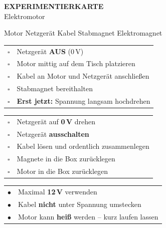 \documentclass[11pt, a5paper]{article}
\begin{document}
\begin{center}
    {\Large\bfseries\textcolor{fachfarbe}{EXPERIMENTIERKARTE}}\\[0.3em]
    {\normalsize Elektromotor}
\end{center}

\vspace{0.3em}

\begin{materialbox}[Material]
Motor \textbullet{} Netzgerät \textbullet{} Kabel \textbullet{} Stabmagnet \textbullet{} Elektromagnet
\end{materialbox}

\begin{checklistbox}[AUFBAU]
\begin{tabular}{@{}cl@{}}
$\square$ & Netzgerät \textbf{AUS} (0\,V) \\[0.3em]
$\square$ & Motor mittig auf dem Tisch platzieren \\[0.3em]
$\square$ & Kabel an Motor und Netzgerät anschließen \\[0.3em]
$\square$ & Stabmagnet bereithalten \\[0.3em]
$\square$ & \textbf{Erst jetzt:} Spannung langsam hochdrehen \\
\end{tabular}
\end{checklistbox}

\begin{checklistbox}[ABBAU]
\begin{tabular}{@{}cl@{}}
$\square$ & Netzgerät auf \textbf{0\,V} drehen \\[0.3em]
$\square$ & Netzgerät \textbf{ausschalten} \\[0.3em]
$\square$ & Kabel lösen und ordentlich zusammenlegen \\[0.3em]
$\square$ & Magnete in die Box zurücklegen \\[0.3em]
$\square$ & Motor in die Box zurücklegen \\
\end{tabular}
\end{checklistbox}

\begin{warnbox}[SICHERHEIT]
\centering
\begin{tabular}{@{}cl@{}}
$\bullet$ & Maximal \textbf{12\,V} verwenden \\[0.3em]
$\bullet$ & Kabel \textbf{nicht} unter Spannung umstecken \\[0.3em]
$\bullet$ & Motor kann \textbf{heiß} werden -- kurz laufen lassen \\
\end{tabular}
\end{warnbox}
\end{document}

